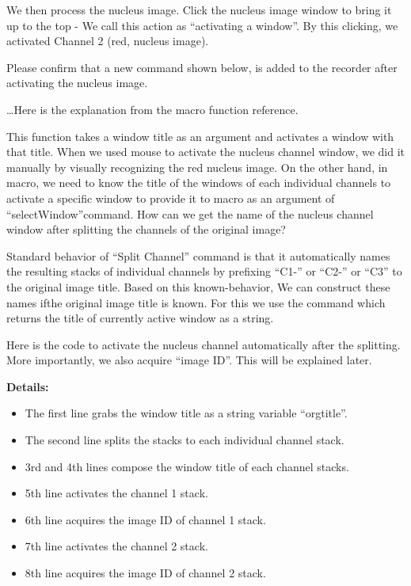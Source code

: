 We then process the nucleus image. Click the nucleus image window to bring it up to the top - We call this action as ``activating a window''. By this clicking, we activated Channel 2 (red, nucleus image).

Please confirm that a new command shown below, is added to the recorder after activating the nucleus image.


\dots  Here is the explanation from the macro function reference. 


This function takes a window title as an argument and activates a window with that title. When we used mouse to activate the nucleus channel window, we did it manually by visually recognizing the red nucleus image. On the other hand, in macro, we need to know the title of the windows of each individual channels to activate a specific window to provide it to macro as an argument of ``selectWindow''command. How can we get the name of the nucleus channel window after splitting the channels of the original image?

Standard behavior of ``Split Channel'' command is that it automatically names the resulting stacks of individual channels by prefixing ``C1-'' or ``C2-'' or ``C3'' to the original image title. Based on this known-behavior, We can construct these names ifthe original image title is known. For this we use the command  which returns the title of currently active window as a string. 


Here is the code to activate the nucleus channel automatically after the splitting. More importantly, we also acquire ``image ID''. This will be explained later.  





\textbf{Details:} 
\begin{itemize}
\item The first line grabs the window title as a string variable ``orgtitle''. 
\item The second line splits the stacks to each individual channel stack.
\item 3rd and 4th lines compose the window title of each channel stacks. 
\item 5th line activates the channel 1 stack. 
\item 6th line acquires the image ID of channel 1 stack. 
\item 7th line activates the channel 2 stack. 
\item 8th line acquires the image ID of channel 2 stack. 
\end{itemize}


